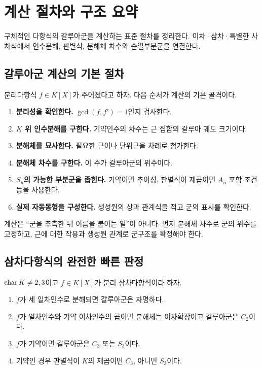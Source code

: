 \clearpage
\section{계산 절차와 구조 요약}
\label{sec:equation-group-workflow}

\begin{learninggoal}
구체적인 다항식의 갈루아군을 계산하는 표준 절차를 정리한다. 이차·삼차·특별한 사차식에서 인수분해, 판별식, 분해체 차수와 순열부분군을 연결한다.
\end{learninggoal}

\subsection{갈루아군 계산의 기본 절차}

분리다항식 $f\in K[X]$가 주어졌다고 하자. 다음 순서가 계산의 기본 골격이다.

\begin{enumerate}
  \item \textbf{분리성을 확인한다.} $\gcd(f,f')=1$인지 검사한다.
  \item \textbf{$K$ 위 인수분해를 구한다.} 기약인수의 차수는 근 집합의 갈루아 궤도 크기이다.
  \item \textbf{분해체를 묘사한다.} 필요한 근이나 단위근을 차례로 첨가한다.
  \item \textbf{분해체 차수를 구한다.} 이 수가 갈루아군의 위수이다.
  \item \textbf{$S_n$의 가능한 부분군을 좁힌다.} 기약이면 추이성, 판별식이 제곱이면 $A_n$ 포함 조건 등을 사용한다.
  \item \textbf{실제 자동동형을 구성한다.} 생성원의 상과 관계식을 적고 군의 표시를 확인한다.
\end{enumerate}

\begin{keyidea}
계산은 ``군을 추측한 뒤 이름을 붙이는 일''이 아니다. 먼저 분해체 차수로 군의 위수를 고정하고, 근에 대한 작용과 생성원 관계로 군구조를 확정해야 한다.
\end{keyidea}

\subsection{삼차다항식의 완전한 빠른 판정}

$\operatorname{char} K\ne2,3$이고 $f\in K[X]$가 분리 삼차다항식이라 하자.

\begin{enumerate}
  \item $f$가 세 일차인수로 분해되면 갈루아군은 자명하다.
  \item $f$가 일차인수와 기약 이차인수의 곱이면 분해체는 이차확장이고 갈루아군은 $C_2$이다.
  \item $f$가 기약이면 갈루아군은 $C_3$ 또는 $S_3$이다.
  \item 기약인 경우 판별식이 $K$의 제곱이면 $C_3$, 아니면 $S_3$이다.
\end{enumerate}


